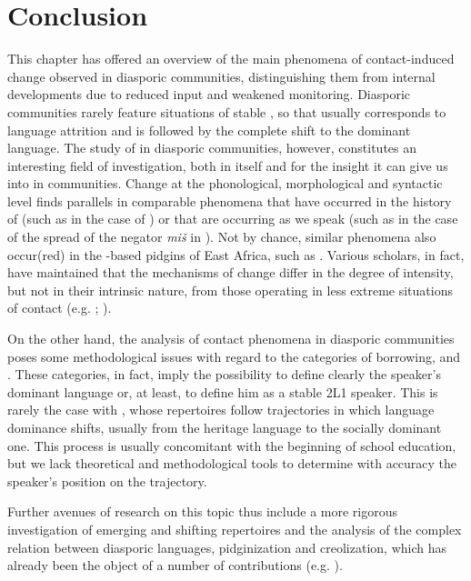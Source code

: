 \documentclass[output=paper]{langsci/langscibook}
\begin{document}
\section{Conclusion}

This chapter has offered an overview of the main phenomena of contact-induced change observed in  diasporic communities, distinguishing them from internal developments due to reduced input and weakened monitoring. Diasporic communities rarely feature situations of stable , so that  usually corresponds to language attrition and is followed by the complete shift to the dominant language. The study of  in diasporic communities, however, constitutes an interesting field of investigation, both in itself and for the insight it can give us into  in  communities. Change at the phonological, morphological and syntactic level finds parallels in comparable phenomena that have occurred in the history of  (such as in the case of ) or that are occurring as we speak (such as in the case of the spread of the negator \textit{miš} in  ). Not by chance, similar phenomena also occur(red) in the -based pidgins of East Africa, such as  . Various scholars, in fact, have maintained that the mechanisms of change differ in the degree of intensity, but not in their intrinsic nature, from those operating in less extreme situations of contact (e.g. \citealt[8]{Miller2003}; \citealt[528]{Lucas2015}).

On the other hand, the analysis of contact phenomena in diasporic communities poses some methodological issues with regard to the categories of borrowing,  and  \citep{VanCoetsem1988,VanCoetsem2000}. These categories, in fact, imply the possibility to define clearly the speaker’s dominant language or, at least, to define him as a stable 2L1 speaker. This is rarely the case with , whose repertoires follow trajectories in which language dominance shifts, usually from the heritage language to the socially dominant one. This process is usually concomitant with the beginning of school education, but we lack theoretical and methodological tools to determine with accuracy the speaker’s position on the trajectory.

Further avenues of research on this topic thus include a more rigorous investigation of emerging and shifting repertoires and the analysis of the complex relation between diasporic languages, pidginization and creolization, which has already been the object of a number of contributions (e.g. \citealt{GonzoSaltarelli1983,Romaine1989}).
\end{document}
